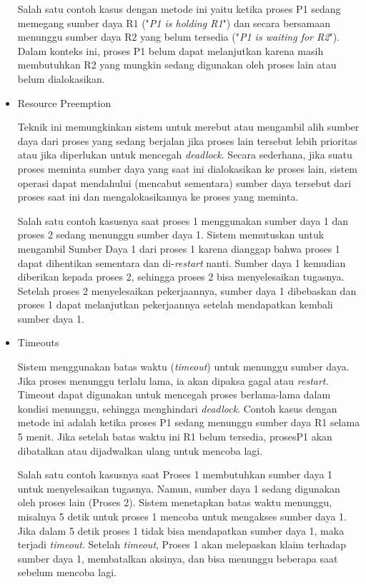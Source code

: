 \documentclass[12pt]{article}
\begin{document}
\begin{itemize}
    \hspace{1cm} Salah satu contoh kasus dengan metode ini yaitu ketika proses P1 sedang memegang sumber daya R1 ("\textit{P1 is holding R1}") dan secara bersamaan menunggu sumber daya R2 yang belum tersedia ("\textit{P1 is waiting for R2}"). Dalam konteks ini, proses P1 belum dapat melanjutkan karena masih membutuhkan R2 yang mungkin sedang digunakan oleh proses lain atau belum dialokasikan.

    \item Resource Preemption

    \hspace{1cm} Teknik ini memungkinkan sistem untuk merebut atau mengambil alih sumber daya dari proses yang sedang berjalan jika proses lain tersebut lebih prioritas atau jika diperlukan untuk mencegah \textit{deadlock}. Secara sederhana, jika suatu proses meminta sumber daya yang saat ini dialokasikan ke proses lain, sistem operasi dapat mendahului (mencabut sementara) sumber daya tersebut dari proses saat ini dan mengalokasikannya ke proses yang meminta. 

    \hspace{1cm} Salah satu contoh kasusnya saat proses 1 menggunakan sumber daya 1 dan proses 2 sedang menunggu sumber daya 1. Sistem memutuskan untuk mengambil Sumber Daya 1 dari proses 1 karena dianggap bahwa proses 1 dapat dihentikan sementara dan di-\textit{restart} nanti. Sumber daya 1 kemudian diberikan kepada proses 2, sehingga proses 2 bisa menyelesaikan tugasnya. Setelah proses 2 menyelesaikan pekerjaannya, sumber daya 1 dibebaskan dan proses 1 dapat melanjutkan pekerjaannya setelah mendapatkan kembali sumber daya 1.

    \item Timeouts

    \hspace{1cm} Sistem menggunakan batas waktu (\textit{timeout}) untuk menunggu sumber daya. Jika proses menunggu terlalu lama, ia akan dipaksa gagal atau \textit{restart}. Timeout dapat digunakan untuk mencegah proses berlama-lama dalam kondisi menunggu, sehingga menghindari \textit{deadlock}. Contoh kasus dengan metode ini adalah ketika proses P1 sedang menunggu sumber daya R1 selama 5 menit. Jika setelah batas waktu ini R1 belum tersedia, prosesP1 akan dibatalkan atau dijadwalkan ulang untuk mencoba lagi.

    \hspace{1cm} Salah satu contoh kasusnya saat Proses 1 membutuhkan sumber daya 1 untuk menyelesaikan tugasnya. Namun, sumber daya 1 sedang digunakan oleh proses lain (Proses 2). Sistem menetapkan batas waktu menunggu, misalnya 5 detik untuk proses 1 mencoba untuk mengakses sumber daya 1. Jika dalam 5 detik proses 1 tidak bisa mendapatkan sumber daya 1, maka terjadi \textit{timeout}. Setelah \textit{timeout}, Proses 1 akan melepaskan klaim terhadap sumber daya 1, membatalkan aksinya, dan bisa menunggu beberapa saat sebelum mencoba lagi.
\end{itemize}
\end{document}

